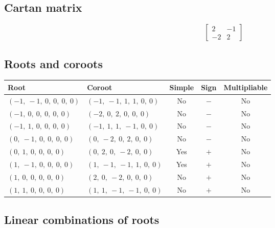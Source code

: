 \documentclass[11pt]{article}
\theoremstyle{definition}
\begin{document}
\subsection{Cartan matrix}
\[
\left[\begin{matrix}2 & -1\\-2 & 2\end{matrix}\right]
\]

\subsection{Roots and coroots}
\begin{center}
\begin{tabular}{|l|l|c|c|c|}
    \hline
    \textbf{Root} & \textbf{Coroot} & \textbf{Simple} & \textbf{Sign} & \textbf{Multipliable} \\
    \hline
    $\left( -1, \  -1, \  0, \  0, \  0, \  0\right)$ & $\left( -1, \  -1, \  1, \  1, \  0, \  0\right)$ & No & $-$ & No \\
    \hline
    $\left( -1, \  0, \  0, \  0, \  0, \  0\right)$ & $\left( -2, \  0, \  2, \  0, \  0, \  0\right)$ & No & $-$ & No \\
    \hline
    $\left( -1, \  1, \  0, \  0, \  0, \  0\right)$ & $\left( -1, \  1, \  1, \  -1, \  0, \  0\right)$ & No & $-$ & No \\
    \hline
    $\left( 0, \  -1, \  0, \  0, \  0, \  0\right)$ & $\left( 0, \  -2, \  0, \  2, \  0, \  0\right)$ & No & $-$ & No \\
    \hline
    $\left( 0, \  1, \  0, \  0, \  0, \  0\right)$ & $\left( 0, \  2, \  0, \  -2, \  0, \  0\right)$ & Yes & $+$ & No \\
    \hline
    $\left( 1, \  -1, \  0, \  0, \  0, \  0\right)$ & $\left( 1, \  -1, \  -1, \  1, \  0, \  0\right)$ & Yes & $+$ & No \\
    \hline
    $\left( 1, \  0, \  0, \  0, \  0, \  0\right)$ & $\left( 2, \  0, \  -2, \  0, \  0, \  0\right)$ & No & $+$ & No \\
    \hline
    $\left( 1, \  1, \  0, \  0, \  0, \  0\right)$ & $\left( 1, \  1, \  -1, \  -1, \  0, \  0\right)$ & No & $+$ & No \\
    \hline
\end{tabular}
\end{center}


\subsection{Linear combinations of roots}
\end{document}
